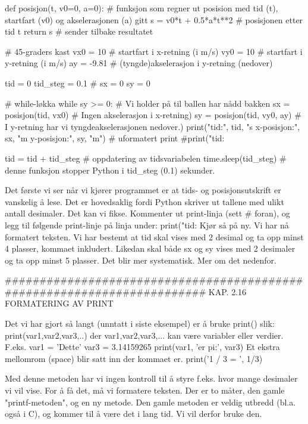 def posisjon(t, v0=0, a=0):    # funksjon som regner ut posision med tid (t), startfart (v0) og akselerasjonen (a) gitt
    s = v0*t + 0.5*a*t**2      # posisjonen etter tid t
    return s                   # sender tilbake resultatet
    

# 45-graders kast
vx0 = 10         # startfart i x-retning (i m/s)
vy0 = 10         # startfart i y-retning (i m/s)
ay = -9.81       # (tyngde)akselerasjon i y-retning (nedover)

tid = 0
tid_steg = 0.1   # 
sx = 0
sy = 0

# while-løkka
while sy >= 0:                    # Vi holder på til ballen har nådd bakken 
    sx = posisjon(tid, vx0)       # Ingen akselerasjon i x-retning) 
    sy = posisjon(tid, vy0, ay)   # I y-retning har vi tyngdeakselerasjonen nedover.)
    print("tid:", tid, "s   x-posisjon:", sx, "m   y-posisjon:", sy, "m")              # uformatert print
    #print("tid: %

    tid = tid + tid_steg          # oppdatering av tidsvariabelen
    time.sleep(tid_steg)          # denne funksjon stopper Python i tid_steg (0.1) sekunder. 


Det første vi ser når vi kjører programmet er at tids- og posisjonsutskrift er vanskelig å lese.
Det er hovedsaklig fordi Python skriver ut tallene med ulikt antall desimaler.
Det kan vi fikse.
Kommenter ut print-linja (sett # foran), og legg til følgende print-linje på linja under:
print("tid: %
Kjør så på ny.
Vi har nå formatert teksten.
Vi har bestemt at tid skal vises med 2 desimal og ta opp minst 4 plasser, kommaet inkludert.
Likedan skal både sx og sy vises med 2 desimaler og ta opp minst 5 plasser.
Det blir mer systematisk. Mer om det nedenfor. 

######################################################################## 
KAP. 2.16  FORMATERING AV PRINT  

Det vi har gjort så langt (unntatt i siste eksempel) er å bruke print() slik:
print(var1,var2,var3,..) der var1,var2,var3,... kan være variabler eller verdier.
F.eks.
var1 = 'Dette'
var3 = 3.14159265
print(var1, 'er pi:', var3)
Et ekstra mellomrom (space) blir satt inn der kommaet er. 
print('1 / 3 = ', 1/3)

Med denne metoden har vi ingen kontroll til å styre f.eks. hvor mange desimaler vi vil vise.
For å få det, må vi formatere teksten.
Der er to måter, den gamle "printf-metoden", og en ny metode.
Den gamle metoden er veldig utbredd (bl.a. også i C), og kommer til å være det i lang tid.
Vi vil derfor bruke den. 


